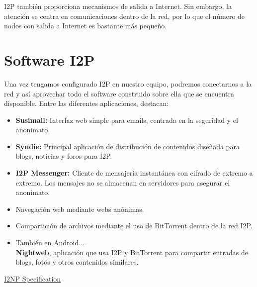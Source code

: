    I2P también proporciona mecanismos de salida a Internet. Sin embargo, la atención se centra en comunicaciones dentro de la red, por lo que el número de nodos con salida a Internet es bastante más pequeño.
   
\section{Software I2P}
Una vez tengamos configurado I2P en nuestro equipo, podremos conectarnos a la red y así aprovechar todo el software construido sobre ella que se encuentra disponible. Entre las diferentes aplicaciones, destacan:
 
 \begin{itemize}
 	\item \textbf{Susimail:} Interfaz web simple para emails, centrada en la seguridad y el anonimato.
 	\item \textbf{Syndie:} Principal aplicación de distribución de contenidos diseñada para blogs, noticias y foros para I2P.
 	\item \textbf{I2P Messenger:} Cliente de mensajería instantánea con cifrado de extremo a extremo. Los mensajes no se almacenan en servidores para asegurar el anonimato.
 	\item Navegación web mediante webs anónimas.
 	\item Compartición de archivos mediante el uso de BitTorrent dentro de la red I2P.
 	\item También en Android$\dots$\\
 	\textbf{Nightweb}, aplicación que usa I2P y BitTorrent para compartir entradas de blogs, fotos y otros contenidos similares.
 \end{itemize}
    
\begin{thebibliography}{9}


   \href{https://geti2p.net/spec/i2np}{I2NP Specification}
   
  
  
  

\end{thebibliography}

